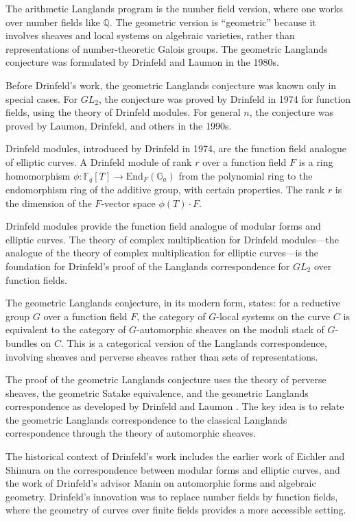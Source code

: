 The arithmetic Langlands program is the number field version, where one works over number fields like $\mathbb{Q}$. The geometric version is ``geometric'' because it involves sheaves and local systems on algebraic varieties, rather than representations of number-theoretic Galois groups. The geometric Langlands conjecture was formulated by Drinfeld and Laumon \cite{drinfeld1987} in the 1980s.

Before Drinfeld's work, the geometric Langlands conjecture was known only in special cases. For $GL_2$, the conjecture was proved by Drinfeld in 1974 for function fields, using the theory of Drinfeld modules. For general $n$, the conjecture was proved by Laumon, Drinfeld, and others in the 1990s.

Drinfeld modules, introduced by Drinfeld in 1974, are the function field analogue of elliptic curves. A Drinfeld module of rank $r$ over a function field $F$ is a ring homomorphism $\phi: \mathbb{F}_q[T] \to \text{End}_F(\mathbb{G}_a)$ from the polynomial ring to the endomorphism ring of the additive group, with certain properties. The rank $r$ is the dimension of the $F$-vector space $\phi(T) \cdot F$.

Drinfeld modules provide the function field analogue of modular forms and elliptic curves. The theory of complex multiplication for Drinfeld modules---the analogue of the theory of complex multiplication for elliptic curves---is the foundation for Drinfeld's proof of the Langlands correspondence for $GL_2$ over function fields.

The geometric Langlands conjecture, in its modern form, states: for a reductive group $G$ over a function field $F$, the category of $G$-local systems on the curve $C$ is equivalent to the category of $G$-automorphic sheaves on the moduli stack of $G$-bundles on $C$. This is a categorical version of the Langlands correspondence, involving sheaves and perverse sheaves rather than sets of representations.

The proof of the geometric Langlands conjecture uses the theory of perverse sheaves, the geometric Satake equivalence, and the geometric Langlands correspondence as developed by Drinfeld and Laumon \cite{drinfeld1987}. The key idea is to relate the geometric Langlands correspondence to the classical Langlands correspondence through the theory of automorphic sheaves.

The historical context of Drinfeld's work includes the earlier work of Eichler and Shimura on the correspondence between modular forms and elliptic curves, and the work of Drinfeld's advisor Manin on automorphic forms and algebraic geometry. Drinfeld's innovation was to replace number fields by function fields, where the geometry of curves over finite fields provides a more accessible setting.

